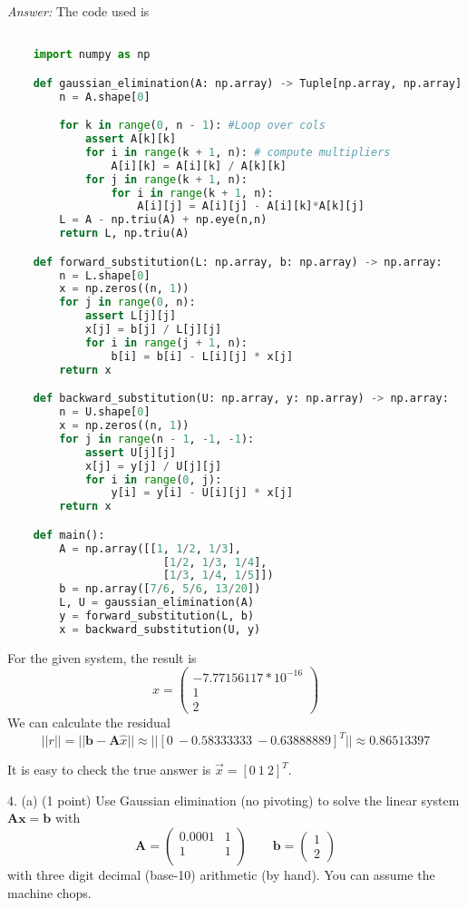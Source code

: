 \documentclass{article}
\begin{document}
    \textit{Answer:} The code used is
    \begin{lstlisting}[language=Python]

    import numpy as np

    def gaussian_elimination(A: np.array) -> Tuple[np.array, np.array]:
        n = A.shape[0]

        for k in range(0, n - 1): #Loop over cols
            assert A[k][k]
            for i in range(k + 1, n): # compute multipliers
                A[i][k] = A[i][k] / A[k][k]
            for j in range(k + 1, n):
                for i in range(k + 1, n):
                    A[i][j] = A[i][j] - A[i][k]*A[k][j]
        L = A - np.triu(A) + np.eye(n,n)
        return L, np.triu(A)

    def forward_substitution(L: np.array, b: np.array) -> np.array:
        n = L.shape[0]
        x = np.zeros((n, 1))
        for j in range(0, n):
            assert L[j][j]
            x[j] = b[j] / L[j][j]
            for i in range(j + 1, n):
                b[i] = b[i] - L[i][j] * x[j]
        return x

    def backward_substitution(U: np.array, y: np.array) -> np.array:
        n = U.shape[0]
        x = np.zeros((n, 1))
        for j in range(n - 1, -1, -1):
            assert U[j][j]
            x[j] = y[j] / U[j][j]
            for i in range(0, j):
                y[i] = y[i] - U[i][j] * x[j]
        return x

    def main():
        A = np.array([[1, 1/2, 1/3],
                        [1/2, 1/3, 1/4],
                        [1/3, 1/4, 1/5]])
        b = np.array([7/6, 5/6, 13/20])
        L, U = gaussian_elimination(A)
        y = forward_substitution(L, b)
        x = backward_substitution(U, y)
    \end{lstlisting}

    For the given system, the result is
    $$\hat{x} =
    \begin{pmatrix}
        -7.77156117*10^{-16} \\ 1 \\ 2
    \end{pmatrix}$$
    We can calculate the residual
    $$||r|| = ||\bm{b} - \bm{A}\hat{x}|| \approx ||[0\ -0.58333333\ -0.63888889]^T||
    \approx 0.86513397$$

    It is easy to check the true answer is $\vec{x} = [0\ 1\ 2]^T$.

    
    \vspace{0.5cm}
    4. (a) (1 point) Use Gaussian elimination (no pivoting) to solve the linear system $\bm{A}\bm{x}=\bm{b}$
    with $$\bm{A}=\begin{pmatrix}
        0.0001 & 1 \\
        1 & 1 \\
    \end{pmatrix} \qquad \bm{b} = \begin{pmatrix}
        1 \\ 2
    \end{pmatrix}$$
    with three digit decimal (base-10) arithmetic (by hand).  You can assume the machine chops.
\end{document}
